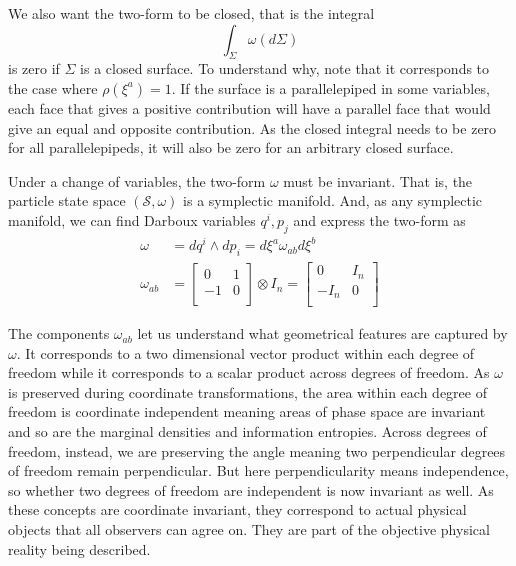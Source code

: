 \documentclass[11pt]{article}
\begin{document}
We also want the two-form to be closed, that is the integral
\begin{equation}
\int_\Sigma \omega(d\Sigma)
\end{equation}
is zero if $\Sigma$ is a closed surface. To understand why, note that it corresponds to the case where $\rho(\xi^a)=1$. If the surface is a parallelepiped in some variables, each face that gives a positive contribution will have a parallel face that would give an equal and opposite contribution. As the closed integral needs to be zero for all parallelepipeds, it will also be zero for an arbitrary closed surface.

Under a change of variables, the two-form $\omega$ must be invariant. That is, the particle state space $(\mathcal{S}, \omega)$ is a symplectic manifold. And, as any symplectic manifold, we can find Darboux variables $q^i, p_j$ and express the two-form as
\begin{equation}
\label{Symplectic}
\begin{aligned}
\omega &= dq^i \wedge dp_i = d\xi^a\omega_{ab}d\xi^b \\
\omega_{ab} &=  \left[
\begin{array}{cc}
0 & 1 \\
-1 & 0 \\
\end{array}
\right] \otimes I_n =
\left[
\begin{array}{cc}
0 & I_n \\
-I_n & 0 \\
\end{array}
\right]
\end{aligned}
\end{equation}

The components $\omega_{ab}$ let us understand what geometrical features are captured by $\omega$. It corresponds to a two dimensional vector product within each degree of freedom while it corresponds to a scalar product across degrees of freedom. As $\omega$ is preserved during coordinate transformations, the area within each degree of freedom is coordinate independent meaning areas of phase space are invariant and so are the marginal densities and information entropies. Across degrees of freedom, instead, we are preserving the angle meaning two perpendicular degrees of freedom remain perpendicular. But here perpendicularity means independence, so whether two degrees of freedom are independent is now invariant as well. As these concepts are coordinate invariant, they correspond to actual physical objects that all observers can agree on. They are part of the objective physical reality being described.
\end{document}
